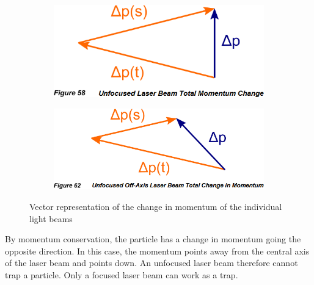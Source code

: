 \documentclass{article}
\begin{document}
\begin{figure}[!ht]
    \centering
    \begin{subfigure}{0.49\textwidth}
        \centering
        \includegraphics[height=0.5\textwidth]{momentumChangeSymmetricLaser.png}
    \end{subfigure}
    \begin{subfigure}{0.49\textwidth}
        \centering
        \includegraphics[height=0.5\textwidth]{momentumChangeAsymmetricLaser.png}
    \end{subfigure}
    \caption{Vector representation of the change in momentum of the individual light beams}
    \label{fig:unfocusedLaserTotMomChg}
\end{figure}
\FloatBarrier

By momentum conservation, the particle has a change in momentum going the opposite direction. In this case, the momentum points away from the central axis of the laser beam and points down. An unfocused laser beam therefore cannot trap a particle. Only a focused laser beam can work as a trap. 
\end{document}
